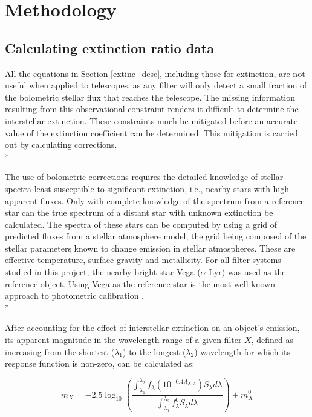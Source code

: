 \documentclass[12pt, a4paper]{report}
\begin{document}
\chapter{Methodology}
\section{Calculating extinction ratio data}

All the equations in Section \ref{extinc_desc}, including those for extinction, are not useful when applied to telescopes, as any filter will only detect a small fraction of the bolometric stellar flux that reaches the telescope. The missing information resulting from this observational constraint renders it difficult to determine the interstellar extinction. These constraints much be mitigated before an accurate value of the extinction coefficient can be determined. This mitigation is carried out by calculating corrections.\\*

The use of bolometric corrections requires the detailed knowledge of stellar spectra least susceptible to significant extinction, i.e., nearby stars with high apparent fluxes. Only with complete knowledge of the spectrum from a reference star can the true spectrum of a distant star with unknown extinction be calculated. The spectra of these stars can be computed by using a grid of predicted fluxes from a stellar atmosphere model, the grid being composed of the stellar parameters known to change emission in stellar atmospheres. These are effective temperature, surface gravity and metallicity. For all filter systems studied in this project, the nearby bright star Vega ($\alpha$ Lyr) was used as the reference object. Using Vega as the reference star is the most well-known approach to photometric calibration \citep{2014MNRAS.444..392C}.\\*

After accounting for the effect of interstellar extinction on an object's emission, its apparent magnitude in the wavelength range of a given filter $X$, defined as increasing from the shortest ($\lambda_{1}$) to the longest ($\lambda_{2}$) wavelength for which its response function is non-zero, can be calculated as:

\begin{equation}
m_{X} = -2.5 \log_{10} \left(\frac{ \int_{\lambda_{1}}^{\lambda_{2}} f_{\lambda} \left( 10^{-0.4 A_{X,\lambda}} \right) S_{\lambda} d\lambda }{ \int_{\lambda_{1}}^{\lambda_{2}} f_{\lambda}^{0} S_{\lambda} d\lambda }\right) + m_{X}^{0}
\label{app_mag_def}
\end{equation}
\end{document}

